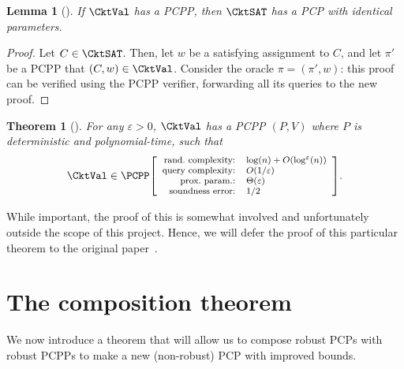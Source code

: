 \documentclass[english,12pt]{reedthesis}
\theoremstyle{plain}
\newtheorem{thm}{Theorem}[section]
\newtheorem{lemma}[lemma]{Lemma}
\theoremstyle{definition}
\theoremstyle{remark}
\newcommand{\pcpp}[4]{%
  \ensuremath%
  \mleft[{\footnotesize\begin{array}{r l}
    \text{rand.\ complexity:} & #1 \\
    \text{query complexity:} & #2 \\
    \text{prox.\ param.:} & #3 \\
    \text{soundness error:} & #4
  \end{array}}\mright]%
}
\begin{document}
\begin{lemma}[{\cite[Prop.\ 2.4]{BGHSV06}}]\label{thm:cktval-cktsat}
  If $\CktVal$ has a PCPP, then $\CktSAT$ has a PCP with identical parameters.
\end{lemma}

\begin{proof}
  Let $C \in \CktSAT$. Then, let $w$ be a satisfying assignment to $C$, and let
  $\pi'$ be a PCPP that $(C, w) \in \CktVal$. Consider the oracle $\pi = (\pi', w)$:
  this proof can be verified using the PCPP verifier, forwarding all its queries
  to the new proof.
\end{proof}

\begin{thm}[{\cite[Theorem 3.3]{BGHSV06}}]\label{thm:ckt-val-pcpp}
  For any $\varepsilon > 0$, $\CktVal$ has a PCPP $(P, V)$ where $P$ is deterministic and
  polynomial-time, such that
  \[
    \CktVal \in \PCPP\pcpp{\log(n) + O(\log^{\varepsilon}(n))}{O(1/\varepsilon)}{\Theta(\varepsilon)}{1/2}.
  \]
\end{thm}

While important, the proof of this is somewhat involved and unfortunately
outside the scope of this project. Hence, we will defer the proof of this
particular theorem to the original paper~\cite{BGHSV06}.

\section{The composition theorem}\label{sec:comp-theorem}

We now introduce a theorem that will allow us to compose robust PCPs with robust
PCPPs to make a new (non-robust) PCP with improved bounds.
\end{document}
